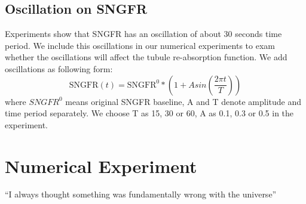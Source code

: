\documentclass{article}
\begin{document}
\subsection{Oscillation on SNGFR}
Experiments show that SNGFR has an oscillation of about 30 seconds time period. We include this oscillations in our numerical experiments to exam whether the oscillations will affect the tubule re-absorption function. We add oscillations as following form:
\begin{equation}
\mathrm{SNGFR}(t)=\mathrm{SNGFR}^{0}*(1+Asin(\frac{2\pi t}{T} ))
\end{equation}
where $SNGFR^{0}$ means original SNGFR baseline, A and T denote amplitude and time period separately. We choose T as 15, 30 or 60, A as 0.1, 0.3 or 0.5 in the experiment.





\section{Numerical Experiment}
``I always thought something was fundamentally wrong with the universe'' \citep{adams1995hitchhiker}



\end{document}
